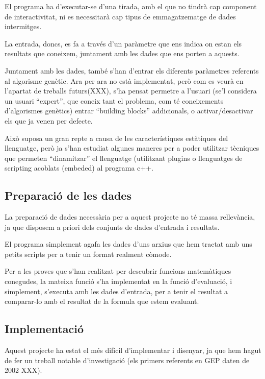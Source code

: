 \documentclass[titlepage,a4paper,12pt]{book}
\begin{document}
El programa ha d'executar-se d'una tirada, amb el que no tindrà cap component de
interactivitat, ni es necessitarà cap tipus de emmagatzematge de dades
intermitges.

La entrada, doncs, es fa a través d'un paràmetre que ens indica on estan els
resultats que coneixem, juntament amb les dades que ens porten a aquests.

Juntament amb les dades, també s'han d'entrar els diferents paràmetres referents
al algorisme genètic.  Ara per ara no està implementat, però com es veurà en
l'apartat de treballs futurs(XXX), s'ha pensat permetre a l'usuari (se'l
considera un usuari ``expert'', que coneix tant el problema, com té coneixements
d'algorismes genètics) entrar ``building blocks'' addicionals, o
activar/desactivar els que ja venen per defecte.

Això suposa un gran repte a causa de les característiques estàtiques del
llenguatge, però ja s'han estudiat algunes maneres per a poder utilitzar
tècniques que permeten ``dinamitzar'' el llenguatge (utilitzant plugins o
llenguatges de scripting acoblats (embeded) al programa c++.

\subsection{Preparació de les dades} %
\label{sub:Preparació de les dades}
La preparació de dades necessària per a aquest projecte no té massa rellevància,
ja que disposem a priori dels conjunts de dades d'entrada i resultats.

El programa simplement agafa les dades d'uns arxius que hem tractat amb uns
petits scripts per a tenir un format realment còmode.

Per a les proves que s'han realitzat per descubrir funcions matemàtiques
conegudes, la mateixa funció s'ha implementat en la funció d'evaluació, i
simplement, s'executa amb les dades d'entrada, per a tenir el resultat a
comparar-lo amb el resultat de la formula que estem evaluant.


\subsection{Implementació} %
\label{sub:Implementacio}

Aquest projecte ha estat el més difícil d'implementar i disenyar, ja que hem
hagut de fer un treball notable d'investigació (els primers referents en GEP
daten de 2002 XXX).
\end{document}
